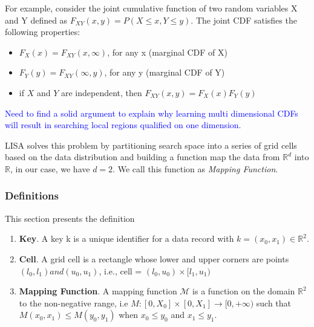 \begin{mscexample}
For example, consider the joint cumulative function of two random variables X and Y defined as $F_{XY}(x, y)=P(X\leq x, Y\leq y)$.
The joint CDF satisfies the following properties:

\begin{itemize}
  \item  {$F_X(x)=F_{XY}(x,\infty)$, for any x (marginal CDF of X)}
  \item  {$F_Y(y)=F_{XY}(\infty,y)$, for any y (marginal CDF of Y)}
  \item  {if $X$ and $Y$ are independent, then $F_{XY}(x,y)=F_X(x)F_Y(y)$}
\end{itemize}

\end{mscexample}

\textcolor{blue} {Need to find a solid argument to explain why learning multi dimensional CDFs will result in  searching local regions qualified on one dimension. }

LISA solves this problem by partitioning search space into a series of grid cells based on the data distribution and building a function map the data from $\mathbb{R}^d$ into $\mathbb{R}$, in our case, we have $d=2$. We call this function as \textit{Mapping Function}.
\subsubsection{Definitions}

This section presents the definition
\begin{enumerate}
	\item \textbf{Key}. A key k is a unique identifier for a data record with $k = (x_{0}, x_{1}) \in \mathbb{R}^{2}$. 
    
	\item \textbf{Cell}. A grid cell is a rectangle whose lower and upper corners are points $(l_{0},l_{1}) and  (u_{0},u_{1})$, i.e.,  cell = $(l_{0},u_{0}) \times [l_{1},u_{1})$
	
	\item \textbf{Mapping Function}. A mapping function $\mathcal{M}$ is a function on the domain $\mathbb{R}^{2}$ to the non-negative range, i.e $M:[0,X_{0}]\times[0,X_{1}]\to [0,+\infty)$ such that $M(x_{0},x_{1}) \leq M(y_{0},y_{1})$ when $x_{0} \leq y_{0}$ and $x_{1} \leq y_{1}$.
	
\end{enumerate}

